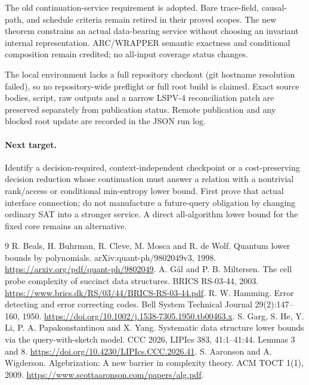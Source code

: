 \documentclass[11pt]{article}
\begin{document}
The old continuation-service requirement is adopted. Bare trace-field,
causal-path, and schedule criteria remain retired in their proved scopes.
The new theorem constrains an actual data-bearing service without choosing
an invariant internal representation. ARC/WRAPPER semantic exactness and
conditional composition remain credited; no all-input coverage status changes.

The local environment lacks a full repository checkout (git hostname
resolution failed), so no repository-wide preflight or full root build is
claimed. Exact source bodies, script, raw outputs and a narrow LSPV-4
reconciliation patch are preserved separately from publication status. Remote
publication and any blocked root update are recorded in the JSON run log.

\paragraph{Next target.}
Identify a decision-required, context-independent checkpoint or a
cost-preserving decision reduction whose continuation must answer a relation
with a nontrivial rank/access or conditional min-entropy lower bound. First
prove that actual interface connection; do not manufacture a future-query
obligation by changing ordinary SAT into a stronger service. A direct
all-algorithm lower bound for the fixed core remains an alternative.

\begin{thebibliography}{9}
 R. Beals, H. Buhrman, R. Cleve, M. Mosca and R. de Wolf.
Quantum lower bounds by polynomials. arXiv:quant-ph/9802049v3, 1998.
\url{https://arxiv.org/pdf/quant-ph/9802049}.
 A. G\'al and P. B. Miltersen.
The cell probe complexity of succinct data structures. BRICS RS-03-44, 2003.
\url{https://www.brics.dk/RS/03/44/BRICS-RS-03-44.pdf}.
 R. W. Hamming. Error detecting and error correcting codes.
Bell System Technical Journal 29(2):147--160, 1950.
\url{https://doi.org/10.1002/j.1538-7305.1950.tb00463.x}.
 S. Garg, S. He, Y. Li, P. A. Papakonstantinou and X. Yang.
Systematic data structure lower bounds via the query-with-sketch model.
CCC 2026, LIPIcs 383, 41:1--41:44. Lemmas 3 and 8.
\url{https://doi.org/10.4230/LIPIcs.CCC.2026.41}.
 S. Aaronson and A. Wigderson.
Algebrization: A new barrier in complexity theory. ACM TOCT 1(1), 2009.
\url{https://www.scottaaronson.com/papers/alg.pdf}.
\end{thebibliography}
\end{document}
